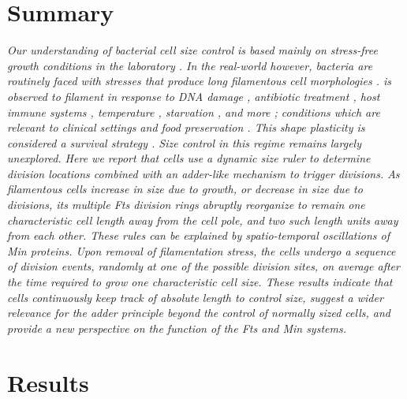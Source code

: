 \section*{Summary}
\textit{
Our understanding of bacterial cell size control is based mainly on stress-free growth conditions in the laboratory \cite{Marshall2012, Jorgensen2004, Robert2015, Chien2012, Turner2012, Wallden2016, Taheri-Araghi2014, Campos2014, Amir2014, Osella2014}. 
In the real-world however, bacteria are routinely faced with stresses that produce long filamentous cell morphologies \cite{Suzuki1967, Rolinson1980, Miller2004, Domadia2007, Justice2006, Moller2012, Jones2004, Linn1987, Kawarai2004, Wainwright1999, Rosenberg1967, Adler1965, Kantor1966, Radman1975, Michel2005, Jones2013, Justice2008, Pulvertaft1952}. 
\ecoli is observed to filament in response to DNA damage \cite{Adler1965, Kantor1966, Radman1975, Michel2005}, antibiotic treatment \cite{Suzuki1967, Rolinson1980, Miller2004, Domadia2007, Pulvertaft1952}, host immune systems \cite{Justice2006, Moller2012}, temperature \cite{Jones2004}, starvation \cite{Wainwright1999}, and more \cite{Kawarai2004, Linn1987, Rosenberg1967}; conditions which are relevant to clinical settings and food preservation \cite{Jones2013}. 
This shape plasticity is considered a survival strategy \cite{Justice2008}. Size control in this regime remains largely unexplored. Here we report that \ecoli cells use a dynamic size ruler to determine division locations combined with an adder-like mechanism to trigger divisions. As filamentous cells increase in size due to growth, or decrease in size due to divisions, its multiple Fts division rings abruptly reorganize to remain one characteristic cell length away from the cell pole, and two such length units away from each other. These rules can be explained by spatio-temporal oscillations of Min proteins. Upon removal of filamentation stress, the cells undergo a sequence of division events, randomly at one of the possible division sites, on average after the time required to grow one characteristic cell size. These results indicate that \ecoli cells continuously keep track of absolute length to control size, suggest a wider relevance for the adder principle beyond the control of normally sized cells, and provide a new perspective on the function of the Fts and Min systems.
}



\section{Results}
